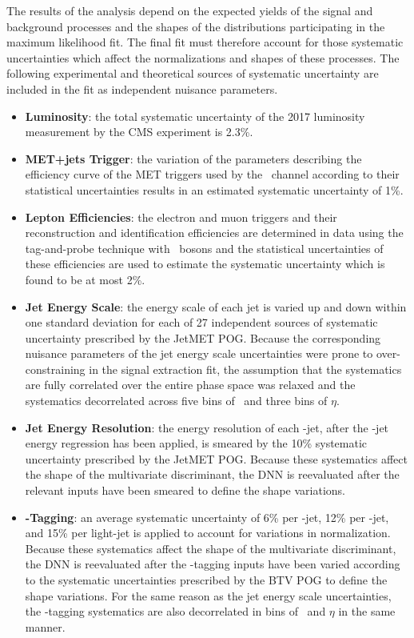 The results of the analysis depend on the expected yields of the signal and background processes and the shapes of the distributions participating in the maximum likelihood fit. The final fit must therefore account for those systematic uncertainties which affect the normalizations and shapes of these processes. The following experimental and theoretical sources of systematic uncertainty are included in the fit as independent nuisance parameters.

\begin{itemize}
  \item \textbf{Luminosity}: the total systematic uncertainty of the 2017 luminosity measurement by the CMS experiment is 2.3\%.\cite{UNCLUMI}
  \item \textbf{MET+jets Trigger}: the variation of the parameters describing the efficiency curve of the MET triggers used by the \ZnnH\ channel according to their statistical uncertainties results in an estimated systematic uncertainty of 1\%.
  \item \textbf{Lepton Efficiencies}: the electron and muon triggers and their reconstruction and identification efficiencies are determined in data using the tag-and-probe technique with \bosZ\ bosons and the statistical uncertainties of these efficiencies are used to estimate the systematic uncertainty which is found to be at most 2\%.
  \item \textbf{Jet Energy Scale}: the energy scale of each jet is varied up and down within one standard deviation for each of 27 independent sources of systematic uncertainty prescribed by the JetMET POG. Because the corresponding nuisance parameters of the jet energy scale uncertainties were prone to over-constraining in the signal extraction fit, the assumption that the systematics are fully correlated over the entire phase space was relaxed and the systematics decorrelated across five bins of \pT\ and three bins of $\eta$.
  \item \textbf{Jet Energy Resolution}: the energy resolution of each \qrkb-jet, after the \qrkb-jet energy regression has been applied, is smeared by the 10\% systematic uncertainty prescribed by the JetMET POG. Because these systematics affect the shape of the multivariate discriminant, the DNN is reevaluated after the relevant inputs have been smeared to define the shape variations.
  \item \textbf{\qrkb-Tagging}: an average systematic uncertainty of 6\% per \qrkb-jet, 12\% per \qrkc-jet, and 15\% per light-jet is applied to account for variations in normalization. Because these systematics affect the shape of the multivariate discriminant, the DNN is reevaluated after the \qrkb-tagging inputs have been varied according to the systematic uncertainties prescribed by the BTV POG to define the shape variations. For the same reason as the jet energy scale uncertainties, the \qrkb-tagging systematics are also decorrelated in bins of \pT\ and $\eta$ in the same manner.

\end{itemize}
